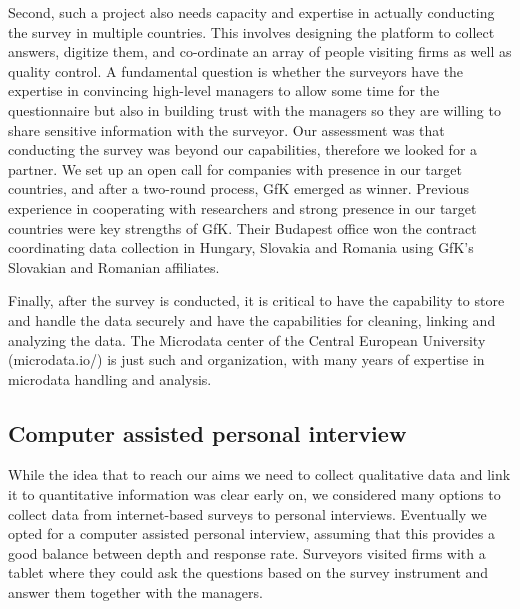\documentclass[final, dvipsnames, authoryear,12pt]{elsarticle}
\begin{document}
Second, such a project also needs capacity and expertise in actually conducting the survey in multiple countries. This involves designing the platform to collect answers, digitize them, and co-ordinate an array of people visiting firms as well as quality control. A fundamental question is whether the surveyors have the expertise in convincing high-level managers to allow some time for the questionnaire but also in building trust with the managers so they are willing to share sensitive information with the surveyor. Our assessment was that conducting the survey was beyond our capabilities, therefore we looked for a partner. We set up an open call for companies with presence in our target countries, and after a two-round process, GfK emerged as winner. Previous experience in cooperating with researchers and strong presence in our target countries were key strengths of GfK. Their Budapest office won the contract coordinating data collection in Hungary, Slovakia and Romania using GfK's Slovakian and Romanian affiliates. 


Finally, after the survey is conducted, it is critical to have the capability to store and handle the data securely and have the capabilities for cleaning, linking and analyzing the data. The Microdata center of the Central European University (microdata.io/) is just such and organization, with many years of expertise in microdata handling and analysis. 


\subsection{Computer assisted personal interview}

While the idea that to reach our aims we need to collect qualitative data and link it to quantitative information was clear early on, we considered many options to collect data from internet-based surveys to personal interviews. Eventually we opted for a computer assisted personal interview, assuming that this provides a good balance between depth and response rate. Surveyors visited firms with a tablet where they could ask the questions based on the survey instrument and answer them together with the managers.
\end{document}
